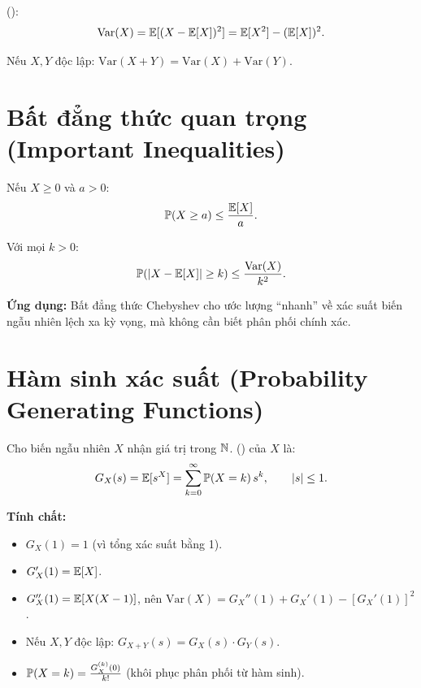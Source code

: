  ():
\[
  \text{Var}(X) = \mathbb{E}[(X - \mathbb{E}[X])^2] = \mathbb{E}[X^2] - (\mathbb{E}[X])^2.
\]

Nếu $X, Y$ độc lập: $\text{Var}(X + Y) = \text{Var}(X) + \text{Var}(Y)$.

\section{Bất đẳng thức quan trọng (Important Inequalities)}

\begin{dinhly}
Nếu $X \geq 0$ và $a > 0$:
\[
  \mathbb{P}(X \geq a) \leq \frac{\mathbb{E}[X]}{a}.
\]
\end{dinhly}

\begin{dinhly}
Với mọi $k > 0$:
\[
  \mathbb{P}(|X - \mathbb{E}[X]| \geq k) \leq \frac{\text{Var}(X)}{k^2}.
\]
\end{dinhly}

\textbf{Ứng dụng:} Bất đẳng thức Chebyshev cho ước lượng ``nhanh'' về xác suất
biến ngẫu nhiên lệch xa kỳ vọng, mà không cần biết phân phối chính xác.

\section{Hàm sinh xác suất (Probability Generating Functions)}
\label{sec:pgf}

\begin{dinhnghia}
Cho biến ngẫu nhiên $X$ nhận giá trị trong $\mathbb{N}$.  () của $X$ là:
\[
  G_X(s) = \mathbb{E}[s^X] = \sum_{k=0}^{\infty} \mathbb{P}(X = k)\, s^k, \qquad |s| \leq 1.
\]
\end{dinhnghia}

\textbf{Tính chất:}
\begin{itemize}[nosep]
  \item $G_X(1) = 1$ (vì tổng xác suất bằng 1).
  \item $G_X'(1) = \mathbb{E}[X]$.
  \item $G_X''(1) = \mathbb{E}[X(X-1)]$, nên $\text{Var}(X) = G_X''(1) + G_X'(1) - [G_X'(1)]^2$.
  \item Nếu $X, Y$ độc lập: $G_{X+Y}(s) = G_X(s) \cdot G_Y(s)$.
  \item $\mathbb{P}(X = k) = \frac{G_X^{(k)}(0)}{k!}$ (khôi phục phân phối từ hàm sinh).
\end{itemize}

